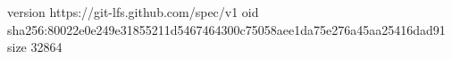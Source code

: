 version https://git-lfs.github.com/spec/v1
oid sha256:80022e0e249e31855211d5467464300c75058aee1da75e276a45aa25416dad91
size 32864
